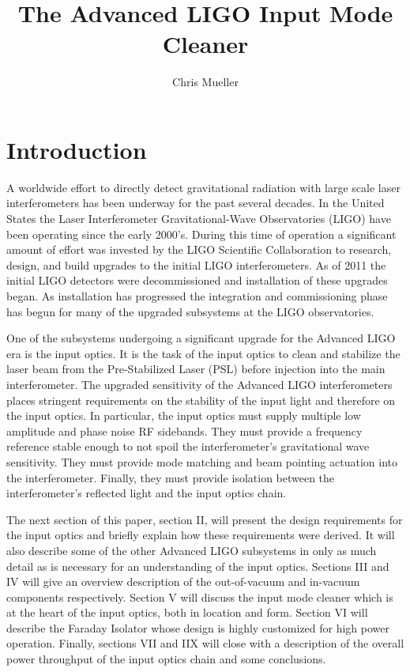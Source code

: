 \documentclass[10pt,a4paper]{article}
\title{The Advanced LIGO Input Mode Cleaner}
\author{Chris Mueller}
\begin{document}
\section{Introduction}

A worldwide effort to directly detect gravitational radiation with large scale laser interferometers 
has been underway for the past several decades.  
In the United States the Laser Interferometer Gravitational-Wave Observatories (LIGO) have been operating
since the early 2000's.  
During this time of operation a significant amount of effort was invested by the LIGO Scientific Collaboration 
to research, design, and build upgrades to the initial LIGO interferometers.  
As of 2011 the initial LIGO detectors were decommissioned and installation of these upgrades began.  
As installation has progressed the integration and commissioning phase has begun for many of the 
upgraded subsystems at the LIGO observatories.  

One of the subsystems undergoing a significant upgrade for the Advanced LIGO era is 
the input optics.  
It is the task of the input optics to clean and stabilize the laser beam from the 
Pre-Stabilized Laser (PSL) before injection into the main interferometer.  
The upgraded sensitivity of the Advanced LIGO interferometers places stringent requirements on 
the stability of the input light and therefore on the input optics.  
In particular, the input optics must supply multiple low amplitude and phase noise RF sidebands.  
They must provide a frequency reference stable enough to not spoil the interferometer's 
gravitational wave sensitivity.  
They must provide mode matching and beam pointing actuation into the interferometer.  
Finally, they must provide isolation between the interferometer's reflected light and the 
input optics chain.  

The next section of this paper, section II, will present the design requirements for the input optics and 
briefly explain how these requirements were derived.  
It will also describe some of the other Advanced LIGO subsystems in only as much detail as 
is necessary for an understanding of the input optics.  
Sections III and IV will give an overview description of the out-of-vacuum and in-vacuum 
components respectively.  
Section V will discuss the input mode cleaner which is at the heart of the input optics, 
both in location and form.  
Section VI will describe the Faraday Isolator whose design is highly customized for high power 
operation.  
Finally, sections VII and IIX will close with a description of the overall power throughput of the 
input optics chain and some conclusions.  
\end{document}
